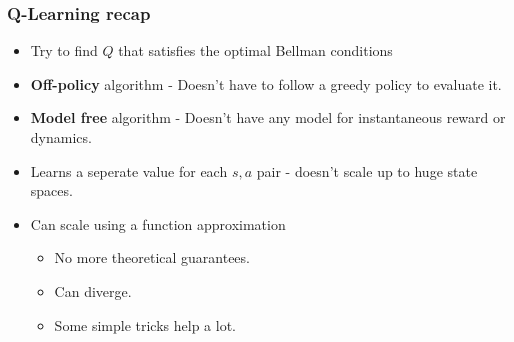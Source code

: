 \documentclass{beamer}
\renewcommand{\high}{\textbf}
\begin{document}
\begin{frame}\frametitle{Q-Learning recap}
\begin{itemize}
    \item Try to find $Q$ that satisfies the optimal Bellman conditions
    \item \high{Off-policy} algorithm - Doesn't have to follow a greedy policy to evaluate it.
    \item \high{Model free} algorithm - Doesn't have any model for instantaneous reward or dynamics.
    \item Learns a seperate value for each $s,a$ pair - doesn't scale up to huge state spaces.
    \item Can scale using a function approximation
    \begin{itemize}
        \item No more theoretical guarantees.
        \item Can diverge. 
        \item Some simple tricks help a lot.
    \end{itemize}
\end{itemize}
\end{frame}
\end{document}
